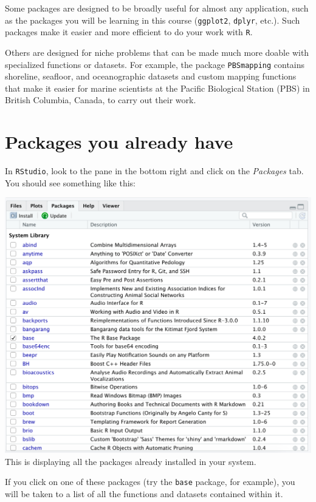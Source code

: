 \documentclass[
]{book}
\begin{document}
Some packages are designed to be broadly useful for almost any application, such as the packages you will be learning in this course (\texttt{ggplot2}, \texttt{dplyr}, etc.). Such packages make it easier and more efficient to do your work with \texttt{R}.

Others are designed for niche problems that can be made much more doable with specialized functions or datasets. For example, the package \texttt{PBSmapping} contains shoreline, seafloor, and oceanographic datasets and custom mapping functions that make it easier for marine scientists at the Pacific Biological Station (PBS) in British Columbia, Canada, to carry out their work.

\hypertarget{packages-you-already-have}{%
\section*{Packages you already have}\label{packages-you-already-have}}

In \texttt{RStudio}, look to the pane in the bottom right and click on the \emph{Packages} tab. You should see something like this:

\includegraphics{img/rstudio_packages.png}
This is displaying all the packages already installed in your system.

If you click on one of these packages (try the \texttt{base} package, for example), you will be taken to a list of all the functions and datasets contained within it.
\end{document}
